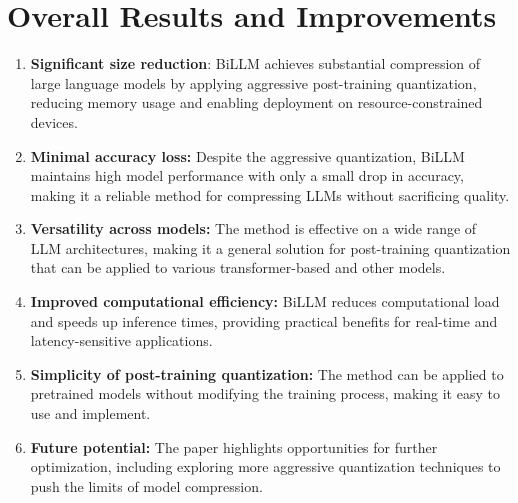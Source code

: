\documentclass{report}
\begin{document}
	\section{Overall Results and Improvements}
	\begin{enumerate}
		\item 
		\textbf{Significant size reduction}: BiLLM achieves substantial compression of large language models by applying aggressive post-training quantization, reducing memory usage and enabling deployment on resource-constrained devices.
		
		\item
		\textbf{Minimal accuracy loss:} Despite the aggressive quantization, BiLLM maintains high model performance with only a small drop in accuracy, making it a reliable method for compressing LLMs without sacrificing quality.
		
		\item
		\textbf{Versatility across models:} The method is effective on a wide range of LLM architectures, making it a general solution for post-training quantization that can be applied to various transformer-based and other models.
		
		\item
		\textbf{Improved computational efficiency:} BiLLM reduces computational load and speeds up inference times, providing practical benefits for real-time and latency-sensitive applications.
		
		\item
		\textbf{Simplicity of post-training quantization:} The method can be applied to pretrained models without modifying the training process, making it easy to use and implement.
		
		\item
		\textbf{Future potential:} The paper highlights opportunities for further optimization, including exploring more aggressive quantization techniques to push the limits of model compression.
	\end{enumerate}
	
	
	
	
	
	
	
	
	
	
	
	
	
	\newpage
	
	
	
\end{document}
